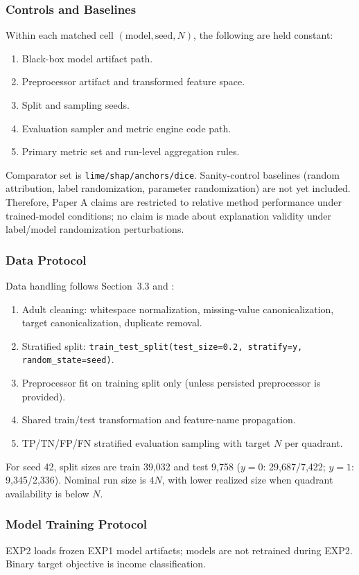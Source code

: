 \documentclass[twoside,11pt]{article}
\begin{document}
\subsubsection{Controls and Baselines}
Within each matched cell $(\text{model},\text{seed},N)$, the following are held constant:
\begin{enumerate}[leftmargin=*]
    \item Black-box model artifact path.
    \item Preprocessor artifact and transformed feature space.
    \item Split and sampling seeds.
    \item Evaluation sampler and metric engine code path.
    \item Primary metric set and run-level aggregation rules.
\end{enumerate}
Comparator set is \texttt{lime/shap/anchors/dice}. Sanity-control baselines
(random attribution, label randomization, parameter randomization) are not yet
included.
Therefore, Paper A claims are restricted to relative method performance under
trained-model conditions; no claim is made about explanation validity under
label/model randomization perturbations.

\subsubsection{Data Protocol}
Data handling follows Section~3.3 and :
\begin{enumerate}[leftmargin=*]
    \item Adult cleaning: whitespace normalization, missing-value canonicalization,
    target canonicalization, duplicate removal.
    \item Stratified split:
    \texttt{train\_test\_split(test\_size=0.2, stratify=y, random\_state=seed)}.
    \item Preprocessor fit on training split only (unless persisted preprocessor is provided).
    \item Shared train/test transformation and feature-name propagation.
    \item TP/TN/FP/FN stratified evaluation sampling with target $N$ per quadrant.
\end{enumerate}
For seed 42, split sizes are train 39,032 and test 9,758
($y=0$: 29,687/7,422; $y=1$: 9,345/2,336). Nominal run size is $4N$, with
lower realized size when quadrant availability is below $N$.

\subsubsection{Model Training Protocol}
EXP2 loads frozen EXP1 model artifacts; models are not retrained during EXP2.
Binary target objective is income classification.
\end{document}
